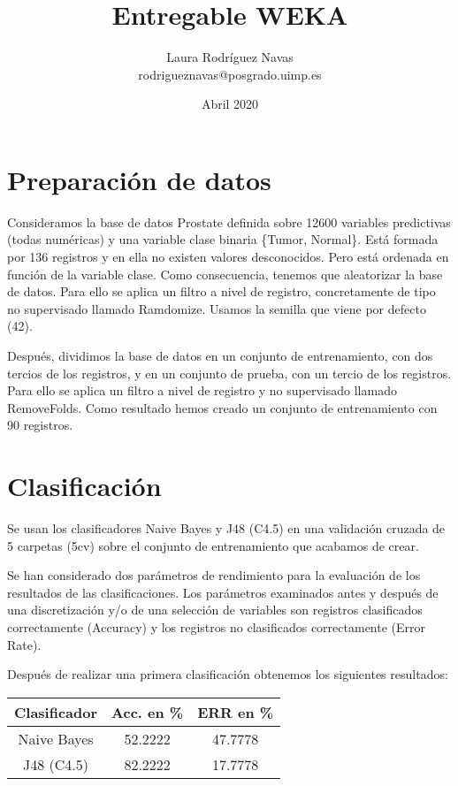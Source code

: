 \documentclass{article}
\title{Entregable WEKA}
\author{Laura Rodríguez Navas \\ rodrigueznavas@posgrado.uimp.es}
\date{Abril 2020}
\begin{document}
\maketitle

\section*{Preparación de datos}

Consideramos la base de datos Prostate definida sobre 12600 variables predictivas (todas numéricas) y una variable clase binaria \{Tumor, Normal\}. Está formada por 136 registros y en ella no existen valores desconocidos. Pero está ordenada en función de la variable clase. Como consecuencia, tenemos que aleatorizar la base de datos. Para ello se aplica un filtro a nivel de registro, concretamente de tipo no supervisado llamado Ramdomize. Usamos la semilla que viene por defecto (42).

Después, dividimos la base de datos en un conjunto de entrenamiento, con dos tercios de los registros, y en un conjunto de prueba, con un tercio de los registros. Para ello se aplica un filtro a nivel de registro y no supervisado llamado RemoveFolds. Como resultado hemos creado un conjunto de entrenamiento con 90 registros.

\section*{Clasificación}

Se usan los clasificadores Naive Bayes y J48 (C4.5) en una validación cruzada de 5 carpetas (5cv) sobre el conjunto de entrenamiento que acabamos de crear.

Se han considerado dos parámetros de rendimiento para la evaluación de los resultados de las clasificaciones. Los parámetros examinados antes y después de una discretización y/o de una selección de variables son registros clasificados correctamente (Accuracy) y los registros no clasificados correctamente (Error Rate). 

Después de realizar una primera clasificación obtenemos los siguientes resultados:

\begin{center}
	\begin{tabular}{ |c|c|c| } 
		\hline
		Clasificador & Acc. en \% & ERR en \% \\
		\hline
		Naive Bayes & 52.2222 & 47.7778 \\ 
		J48 (C4.5) & 82.2222 & 17.7778 \\ 
		\hline
	\end{tabular}
\end{center}
\end{document}
